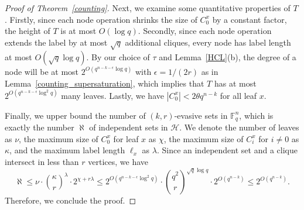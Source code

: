 \documentclass[11pt]{article}
\theoremstyle{definition}
\begin{document}
\begin{proof}[Proof of Theorem~\ref{counting}]
    Next, we examine some quantitative properties of $T$. Firstly, since each node operation shrinks the size of $C^x_0$ by a constant factor, the height of $T$ is at most $O(\log q)$. Secondly, since each node operation extends the label by at most $\sqrt{q}$ additional cliques, every node has label length at most $O(\sqrt{q}\log q)$. By our choice of $\tau$ and Lemma~\ref{HCL}(b), the degree of a node will be at most $2^{O(q^{n-k-\epsilon}\log q)}$ with $\epsilon=1/(2r)$ as in Lemma~\ref{counting_supersaturation}, which implies that $T$ has at most $2^{O(q^{n-k-\epsilon}\log^2 q)}$ many leaves. Lastly, we have $|C^x_0| < 2\theta q^{n-k}$ for all leaf $x$.

    Finally, we upper bound the number of $(k,r)$-evasive sets in $\mathbb{F}_q^n$, which is exactly the number $\aleph$ of independent sets in $\mathcal{H}$. We denote the number of leaves as $\nu$, the maximum size of $C^x_0$ for leaf $x$ as $\chi$, the maximum size of $C^x_i$ for $i\neq 0$ as $\kappa$, and the maximum label length $\ell_x$ as $\lambda$. Since an independent set and a clique intersect in less than $r$ vertices, we have \begin{equation*}
        \aleph \leq \nu \cdot \binom{\kappa}{r}^\lambda \cdot 2^{\chi+r\lambda}  \leq 2^{O(q^{n-k-\epsilon}\log^2 q)} \cdot \binom{q^2}{r}^{\sqrt{q}\log q} \cdot 2^{O(q^{n-k})} \leq 2^{O(q^{n-k})}.
    \end{equation*} Therefore, we conclude the proof.
\end{proof}
\end{document}
